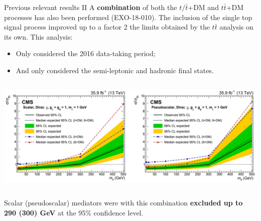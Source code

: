 \documentclass[8pt]{beamer}
\begin{document}
\begin{frame}{Previous relevant results II}
\justifying
\vspace{5pt}
A \textbf{combination} of both the $t/ \bar t$+DM and $t \bar t$+DM processes has also been performed (EXO-18-010). The inclusion of the single top signal process \alert{improved up to a factor 2} the limits obtained by the $t \bar t$ analysis on its own. This analysis: %

\begin{itemize}
\item Only considered the 2016 data-taking period;
\item And only considered the semi-leptonic and hadronic final states.
\end{itemize} \vfill

\begin{center}
\begin{columns}
	\begin{column}{1.0\textwidth}
		\begin{center}
			\includegraphics[width=1.0\textwidth]{figs/limitsprevious.png}
    		 \end{center}
	\end{column} \hfill
\end{columns}
\end{center} \vfill

Scalar (pseudoscalar) mediators were with this combination \textbf{excluded up to 290 (300) GeV} at the 95\% confidence level. \vfill %
\end{frame}
\end{document}
